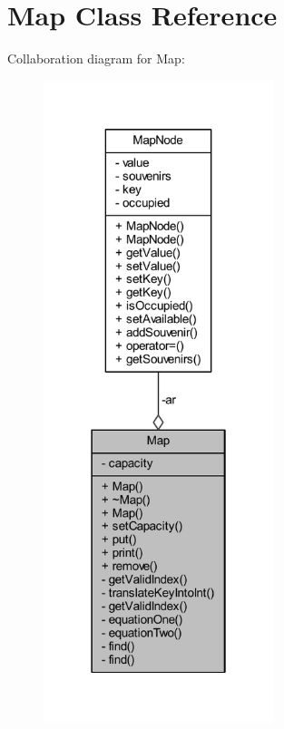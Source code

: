 \hypertarget{class_map}{}\section{Map Class Reference}
\label{class_map}


Collaboration diagram for Map\+:
\nopagebreak
\begin{figure}[H]
\begin{center}
\leavevmode
\includegraphics[width=190pt]{class_map__coll__graph}
\end{center}
\end{figure}
